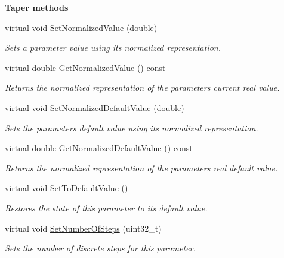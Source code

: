 \begin{Indent}{\bf Taper methods}\par
\begin{DoxyCompactItemize}
\item 
virtual void \hyperlink{a00040_ab1f95daedb92e9abcdc61bd59c96edb8}{Set\+Normalized\+Value} (double)
\begin{DoxyCompactList}\small\item\em Sets a parameter value using it\textquotesingle{}s normalized representation. \end{DoxyCompactList}\item 
virtual double \hyperlink{a00040_a3e6d886444a27271a30f83c4fd56049a}{Get\+Normalized\+Value} () const 
\begin{DoxyCompactList}\small\item\em Returns the normalized representation of the parameter\textquotesingle{}s current real value. \end{DoxyCompactList}\item 
virtual void \hyperlink{a00040_a1b8e2cfc127bcf78a137d954f31473fd}{Set\+Normalized\+Default\+Value} (double)
\begin{DoxyCompactList}\small\item\em Sets the parameter\textquotesingle{}s default value using its normalized representation. \end{DoxyCompactList}\item 
virtual double \hyperlink{a00040_a9ee803b705d5a7d5f0725f966f469d1d}{Get\+Normalized\+Default\+Value} () const 
\begin{DoxyCompactList}\small\item\em Returns the normalized representation of the parameter\textquotesingle{}s real default value. \end{DoxyCompactList}\item 
virtual void \hyperlink{a00040_a8a1d6767ac8756cce5fe8c4e727d1412}{Set\+To\+Default\+Value} ()
\begin{DoxyCompactList}\small\item\em Restores the state of this parameter to its default value. \end{DoxyCompactList}\item 
virtual void \hyperlink{a00040_ae3b90766ffe8a9c06465b2bb0715cd22}{Set\+Number\+Of\+Steps} (uint32\+\_\+t)
\begin{DoxyCompactList}\small\item\em Sets the number of discrete steps for this parameter. \end{DoxyCompactList}\item 

\end{DoxyCompactItemize}
\end{Indent}
